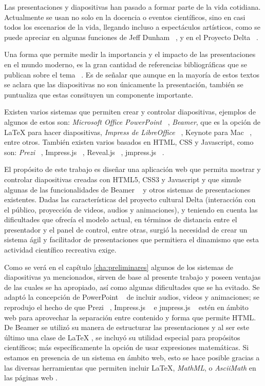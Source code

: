 \begin{introduction}

	Las presentaciones y diapositivas han pasado a formar parte de la vida cotidiana. Actualmente se usan no solo en la docencia o eventos científicos, sino en casi todos los escenarios de la vida, llegando incluso a espectáculos artísticos, como se puede apreciar en algunas funciones de Jeff Dunham ~\cite{dunham}, y en el Proyecto Delta ~\cite{delta}.


	Una forma que permite medir la importancia y el impacto de las presentaciones en el mundo moderno, es la gran cantidad de referencias bibliográficas que se publican sobre el tema ~\cite{alley, duarte, tufte}. Es de señalar que aunque en la mayoría de estos textos se aclara que las diapositivas no son únicamente la presentación, también se puntualiza que estas consituyen un componente importante.

	Existen varios sistemas que permiten crear y controlar diapositivas, ejemplos de algunos de estos son: \textit{Microsoft Office PowerPoint} ~\cite{powerpoint}, \textit{Beamer}, que es la opción de \LaTeX{} para hacer diapositivas, \textit{Impress de LibreOffice} ~\cite{libreoffice}, Keynote para Mac ~\cite{keynote}, entre otros. También existen varios basados en HTML, CSS y Javascript, como son: \textit{Prezi} ~\cite{prezi}, Impress.js ~\cite{impress}, Reveal.js ~\cite{reveal}, jmpress.js ~\cite{jmpress}.

	El propósito de este trabajo es diseñar una aplicación web que permita mostrar y controlar diapositivas creadas con HTML5, CSS3 y Javascript y que simule algunas de las funcionalidades de Beamer ~\cite{beamer} y otros sistemas de presentaciones existentes. Dadas las características del proyecto cultural Delta (interacción con el público, proyección de videos, audios y animaciones), y teniendo en cuenta las dificultades que ofrecía el modelo actual, en términos de distancia entre el presentador y el panel de control, entre otras, surgió la necesidad de crear un sistema ágil y facilitador de presentaciones que permitiera el dinamismo que esta actividad científico recreativa exige.

	Como se verá en el capítulo \ref{cha:preliminares} algunos de los sistemas de diapositivas ya mencionados, sirven de base al presente trabajo y poseen ventajas de las cuales se ha apropiado, así como algunas dificultades que se ha evitado. Se adaptó la concepción de PowerPoint ~\cite{powerpoint} de incluir audios, videos y animaciones; se reprodujo el hecho de que Prezi ~\cite{prezi}, Impress.js ~\cite{impress} e jmpress.js ~\cite{jmpress} estén en ámbito web para aprovechar la separación entre contenido y forma que permite HTML. De Beamer se utilizó su manera de estructurar las presentaciones y al ser este último una clase de \LaTeX{} \cite{latex}, se incluyó su utilidad especial para propósitos científicos; más específicamente la opción de usar expresiones matemáticas. Si estamos en presencia de un sistema en ámbito web, esto se hace posible gracias a las diversas herramientas que permiten incluir \LaTeX, \textit{MathML}, o \textit{AsciiMath} en las páginas web \cite{mathjax, katex, phpmath}. 



\end{introduction}

